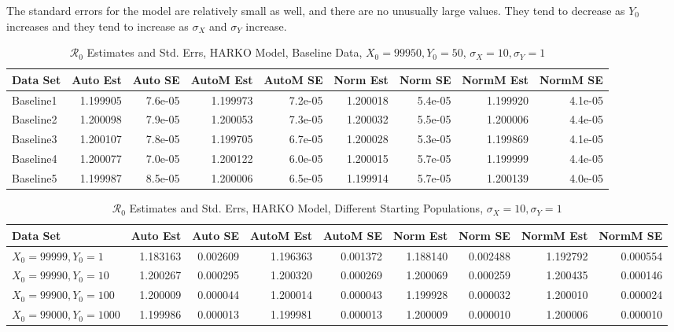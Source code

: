 \documentclass[12pt]{article}
\newcommand{\rr}{\ensuremath{\mathcal{R}_0}}
\begin{document}
The standard errors for the model are relatively small as well, and there are no unusually large values. They tend to decrease as $Y_0$ increases and they tend to increase as $\sigma_X$ and $\sigma_Y$ increase.

\begin{table}[H]
	
	\caption{$\rr$ Estimates and Std. Errs, HARKO Model, 
		Baseline Data, $X_0 = 99950, Y_0 = 50$, 
		$\sigma_X = 10, \sigma_Y = 1$}
	\begin{footnotesize}
		\hskip -1cm
		\begin{tabular}{l|r|r|r|r|r|r|r|r}
			\hline
			Data Set & Auto Est & Auto SE & AutoM Est & AutoM SE & Norm Est & Norm SE & NormM Est & NormM SE\\
			\hline
			Baseline1 & 1.199905 & 7.6e-05 & 1.199973 & 7.2e-05 & 1.200018 & 5.4e-05 & 1.199920 & 4.1e-05\\
			\hline
			Baseline2 & 1.200098 & 7.9e-05 & 1.200053 & 7.3e-05 & 1.200032 & 5.5e-05 & 1.200006 & 4.4e-05\\
			\hline
			Baseline3 & 1.200107 & 7.8e-05 & 1.199705 & 6.7e-05 & 1.200028 & 5.3e-05 & 1.199869 & 4.1e-05\\
			\hline
			Baseline4 & 1.200077 & 7.0e-05 & 1.200122 & 6.0e-05 & 1.200015 & 5.7e-05 & 1.199999 & 4.4e-05\\
			\hline
			Baseline5 & 1.199987 & 8.5e-05 & 1.200006 & 6.5e-05 & 1.199914 & 5.7e-05 & 1.200139 & 4.0e-05\\
			\hline
		\end{tabular}
	\end{footnotesize}
\end{table}

\begin{table}[H]
	
	\caption{$\rr$ Estimates and Std. Errs, HARKO Model,
		Different Starting Populations, 
		$\sigma_X = 10, \sigma_Y = 1$}
	\begin{footnotesize}
		\hskip -1.7cm
		\begin{tabular}{l|r|r|r|r|r|r|r|r}
			\hline
			Data Set & Auto Est & Auto SE & AutoM Est & AutoM SE & Norm Est & Norm SE & NormM Est & NormM SE\\
			\hline
			$X_0 = 99999, Y_0 = 1$ & 1.183163 & 0.002609 & 1.196363 & 0.001372 & 1.188140 & 0.002488 & 1.192792 & 0.000554\\
			\hline
			$X_0 = 99990, Y_0 = 10$ & 1.200267 & 0.000295 & 1.200320 & 0.000269 & 1.200069 & 0.000259 & 1.200435 & 0.000146\\
			\hline
			$X_0 = 99900, Y_0 = 100$ & 1.200009 & 0.000044 & 1.200014 & 0.000043 & 1.199928 & 0.000032 & 1.200010 & 0.000024\\
			\hline
			$X_0 = 99000, Y_0 = 1000$ & 1.199986 & 0.000013 & 1.199981 & 0.000013 & 1.200009 & 0.000010 & 1.200006 & 0.000010\\
			\hline
		\end{tabular}
	\end{footnotesize}
\end{table}
\end{document}
